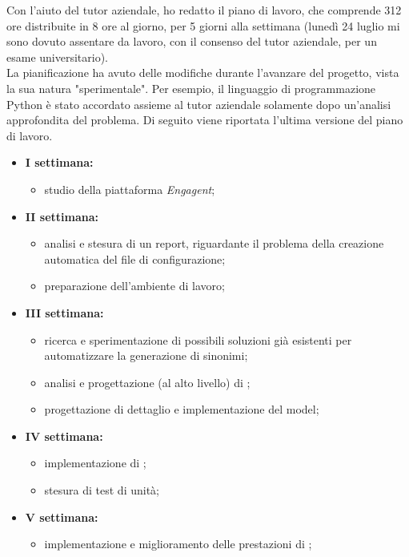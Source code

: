 Con l'aiuto del tutor aziendale, ho redatto il piano di lavoro, che comprende 312 ore distribuite in 8 ore al giorno, per 5 giorni alla settimana (lunedì 24 luglio mi sono dovuto assentare da lavoro, con il consenso del tutor aziendale, per un esame universitario).\\
La pianificazione ha avuto delle modifiche durante l'avanzare del progetto, vista la sua natura "sperimentale". Per esempio, il linguaggio di programmazione Python è stato accordato assieme al tutor aziendale solamente dopo un'analisi approfondita del problema.
Di seguito viene riportata l'ultima versione del piano di lavoro.
\begin{itemize}
    \item \textbf{I settimana:}
    \begin{itemize}
        \item studio della piattaforma \emph{Engagent};
    \end{itemize}
    \item \textbf{II settimana:}
    \begin{itemize}
        \item analisi e stesura di un report, riguardante il problema della creazione automatica del file di configurazione;
        \item preparazione dell'ambiente di lavoro;
    \end{itemize}
    \item \textbf{III settimana:}
        \begin{itemize}
            \item ricerca e sperimentazione di possibili soluzioni già esistenti per automatizzare la generazione di sinonimi;
            \item analisi e progettazione (al alto livello) di \app{};
            \item progettazione di dettaglio e implementazione del model;
        \end{itemize}
    \item \textbf{IV settimana:}
    \begin{itemize}
        \item implementazione di \app{};
        \item stesura di test di unità;
    \end{itemize}
    \item \textbf{V settimana:}
    \begin{itemize}
        \item implementazione e miglioramento delle prestazioni di \emph{\app{}};

\end{itemize}
\end{itemize}
